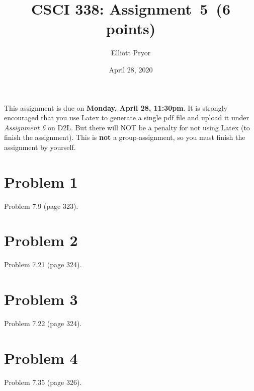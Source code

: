 \documentclass[11pt]{article}
\begin{document}
\date{April 28, 2020}
\title{CSCI 338: Assignment~5~(6 points)}

\author{Elliott Pryor}


\maketitle

\noindent
This assignment is due on {\bf Monday, April 28, 11:30pm}. It is strongly
encouraged that you use Latex to generate a single pdf file and upload it
under {\em Assignment 6} on D2L. But there will NOT be a penalty for not
using Latex (to finish the assignment). This is {\bf not} a group-assignment,
so you must finish the assignment by yourself.

\section*{Problem 1}

Problem 7.9 (page 323).
\newline



\section*{Problem 2}

Problem 7.21 (page 324).
\newline

\section*{Problem 3}

Problem 7.22 (page 324).
\newline

\section*{Problem 4}

Problem 7.35 (page 326).
\end{document}
